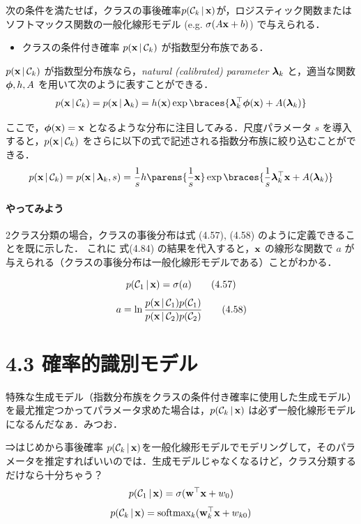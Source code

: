 \begin{embedbox}
次の条件を満たせば，クラスの事後確率$p({\mathcal{C}}_k \,|\, {\mathbf{x}})$が，ロジスティック関数またはソフトマックス関数の一般化線形モデル (e.g. $\sigma(A{\mathbf{x}} + b)$) で与えられる．
\begin{itemize}
  \item クラスの条件付き確率 $p({\mathbf{x}} \,|\, {\mathcal{C}}_k)$ が指数型分布族である．
\end{itemize}
\end{embedbox}

$p({\mathbf{x}} \,|\, {\mathcal{C}}_k)$ が指数型分布族なら，\emph{natural (calibrated) parameter} $\boldsymbol{\lambda}_k$ と，適当な関数 $\boldsymbol{\phi}, h, A$ を用いて次のように表すことができる．
\begin{equation}
  p(\vx \given \cC_k) = p(\vx \given \vlambda_k) = h(\vx) \exp \braces{\vlambda_k\trans \vphi(\vx) + A(\vlambda_k)}
\end{equation}

ここで，$\boldsymbol{\phi}({\mathbf{x}}) = {\mathbf{x}}$ となるような分布に注目してみる．尺度パラメータ $s$ を導入すると，$p({\mathbf{x}} \,|\, {\mathcal{C}}_k)$ をさらに以下の式で記述される指数分布族に絞り込むことができる．
\begin{equation}
  p(\vx \given \cC_k) = p(\vx \given \vlambda_k, s) = \finv{s} h\parens{\finv{s}\vx} \exp \braces{ \finv{s} \vlambda_k\trans \vx  + A(\vlambda_k) }
\end{equation}

\paragraph{やってみよう}
2クラス分類の場合，クラスの事後分布は式 (4.57), (4.58) のように定義できることを既に示した．
これに 式(4.84) の結果を代入すると，${\mathbf{x}}$ の線形な関数で $a$ が与えられる（クラスの事後分布は一般化線形モデルである）ことがわかる．
\begin{embedbox}
  \[
  p({\mathcal{C}}_1\,|\,{\mathbf{x}}) = \sigma(a) \tag{4.57}
  \]
  \[
    a = \ln \frac{p({\mathbf{x}}\,|\,{\mathcal{C}}_{1})p({\mathcal{C}}_{1})}{p({\mathbf{x}}\,|\,{\mathcal{C}}_{2})p({\mathcal{C}}_{2})} \tag{4.58}
  \]
\end{embedbox}

\newpage
\section*{4.3 確率的識別モデル}

特殊な生成モデル（指数分布族をクラスの条件付き確率に使用した生成モデル）を最尤推定つかってパラメータ求めた場合は，$p({\mathcal{C}}_k \,|\, {\mathbf{x}})$ は必ず一般化線形モデルになるんだなぁ．みつお．

⇒はじめから事後確率 $p({\mathcal{C}}_k \,|\, {\mathbf{x}})$を一般化線形モデルでモデリングして，そのパラメータを推定すればいいのでは．生成モデルじゃなくなるけど，クラス分類するだけなら十分ちゃう？
\[
  p({\mathcal{C}}_1 \,|\, {\mathbf{x}}) = \sigma({\mathbf{w}}^\top {\mathbf{x}} + w_0) 
\]
\[
  p({\mathcal{C}}_k \,|\, {\mathbf{x}}) = \mathrm{softmax}_k({\mathbf{w}}_k^\top {\mathbf{x}} + w_{k0})
\]

